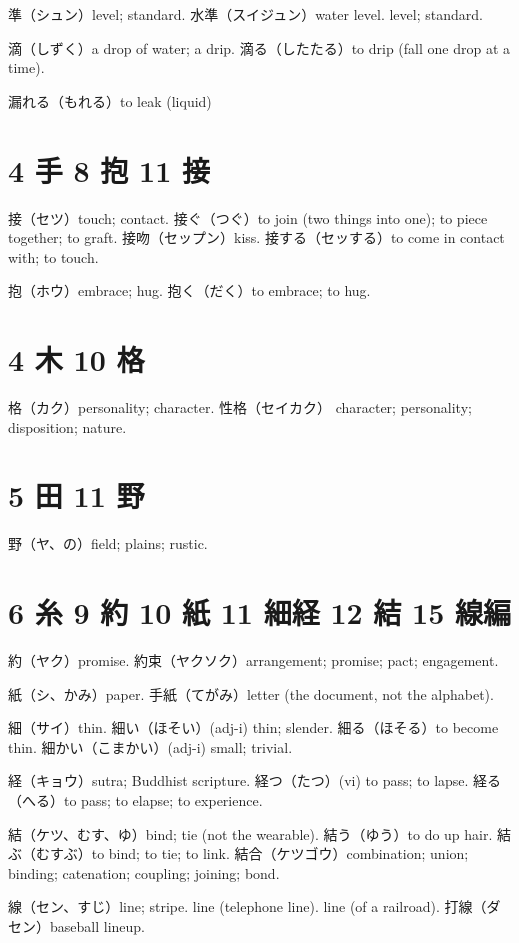 準（シュン）level; standard.
水準（スイジュン）water level. level; standard.

滴（しずく）a drop of water; a drip.
滴る（したたる）to drip (fall one drop at a time).

漏れる（もれる）to leak (liquid)

\section{4 手 8 抱 11 接}

接（セツ）touch; contact.
接ぐ（つぐ）to join (two things into one); to piece together; to graft.
接吻（セップン）kiss.
接する（セッする）to come in contact with; to touch.

抱（ホウ）embrace; hug.
抱く（だく）to embrace; to hug.

\section{4 木 10 格}

格（カク）personality; character.
性格（セイカク）
character; personality; disposition; nature.

\section{5 田 11 野}

野（ヤ、の）field; plains; rustic.

\section{6 糸 9 約 10 紙 11 細経 12 結 15 線編}

約（ヤク）promise.
約束（ヤクソク）arrangement; promise; pact; engagement.

紙（シ、かみ）paper.
手紙（てがみ）letter (the document, not the alphabet).

細（サイ）thin.
細い（ほそい）(adj-i) thin; slender.
細る（ほそる）to become thin.
細かい（こまかい）(adj-i) small; trivial.

経（キョウ）sutra; Buddhist scripture.
経つ（たつ）(vi) to pass; to lapse.
経る（へる）to pass; to elapse; to experience.

結（ケツ、むす、ゆ）bind; tie (not the wearable).
結う（ゆう）to do up hair.
結ぶ（むすぶ）to bind; to tie; to link.
結合（ケツゴウ）combination; union; binding; catenation; coupling; joining; bond.

線（セン、すじ）line; stripe.
line (telephone line).
line (of a railroad).
打線（ダセン）baseball lineup.

